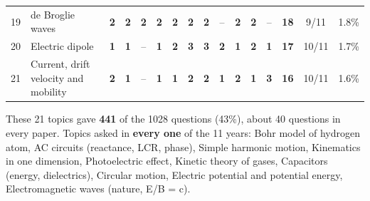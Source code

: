 \documentclass[10pt,a4paper]{article}
\begin{document}
{\begin{tabularx}{\linewidth}{@{}r>{\raggedright\arraybackslash}X*{11}{c}ccc@{}}
19 & de Broglie waves & \textbf{2} & \textbf{2} & \textbf{2} & \textbf{2} & \textbf{2} & \textbf{2} & \textbf{2} & {\color{gray!60}--} & \textbf{2} & \textbf{2} & {\color{gray!60}--} & \textbf{18} & 9/11 & 1.8\%\\
20 & Electric dipole & \textbf{1} & \textbf{1} & {\color{gray!60}--} & \textbf{1} & \textbf{2} & \textbf{3} & \textbf{3} & \textbf{2} & \textbf{1} & \textbf{2} & \textbf{1} & \textbf{17} & 10/11 & 1.7\%\\
21 & Current, drift velocity and mobility & \textbf{2} & \textbf{1} & {\color{gray!60}--} & \textbf{1} & \textbf{1} & \textbf{2} & \textbf{2} & \textbf{1} & \textbf{2} & \textbf{1} & \textbf{3} & \textbf{16} & 10/11 & 1.6\%\\
\bottomrule\end{tabularx}}\par\smallskip
{\small These 21 topics gave \textbf{441} of the 1028 questions (43\%), about 40 questions in every paper.
Topics asked in \textbf{every one} of the 11 years: Bohr model of hydrogen atom, AC circuits (reactance, LCR, phase), Simple harmonic motion, Kinematics in one dimension, Photoelectric effect, Kinetic theory of gases, Capacitors (energy, dielectrics), Circular motion, Electric potential and potential energy, Electromagnetic waves (nature, E/B = c).}
\end{document}
